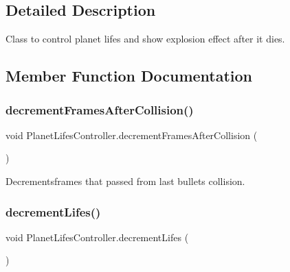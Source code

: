 \subsection{Detailed Description}
Class to control planet lifes and show explosion effect after it dies. 



\subsection{Member Function Documentation}
\mbox{\label{class_planet_lifes_controller_acf21848a75efc48db45c5972cd732905}} 
\subsubsection{\texorpdfstring{decrement\+Frames\+After\+Collision()}{decrementFramesAfterCollision()}}
{\footnotesize\ttfamily void Planet\+Lifes\+Controller.\+decrement\+Frames\+After\+Collision (\begin{DoxyParamCaption}{ }\end{DoxyParamCaption})\hspace{0.3cm}{\ttfamily [private]}}



Decrementsframes that passed from last bullet\textquotesingle{}s collision. 

\mbox{\label{class_planet_lifes_controller_af81b69ec4a2d059ebd24bff38031a466}} 
\subsubsection{\texorpdfstring{decrement\+Lifes()}{decrementLifes()}}
{\footnotesize\ttfamily void Planet\+Lifes\+Controller.\+decrement\+Lifes (\begin{DoxyParamCaption}{ }\end{DoxyParamCaption})}



